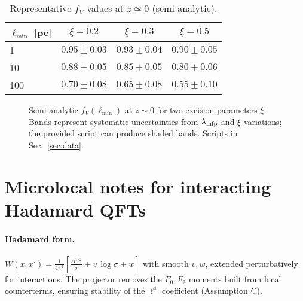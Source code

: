 \documentclass[aps,prd,onecolumn,superscriptaddress,nofootinbib]{revtex4-2}
\begin{document}
\begin{table}[b]
\centering
\caption{Representative \(f_V\) values at \(z\simeq 0\) (semi-analytic).}
\label{tab:fV}
\begin{tabular}{lccc}
\toprule
\(\ell_{\min}\) [pc] & \(\xi=0.2\) & \(\xi=0.3\) & \(\xi=0.5\) \\
\midrule
1   & \(0.95\pm0.03\) & \(0.93\pm0.04\) & \(0.90\pm0.05\) \\
10  & \(0.88\pm0.05\) & \(0.85\pm0.05\) & \(0.80\pm0.06\) \\
100 & \(0.70\pm0.08\) & \(0.65\pm0.08\) & \(0.55\pm0.10\) \\
\bottomrule
\end{tabular}
\end{table}

\begin{figure}[t]
\centering
{}
\caption{Semi-analytic \(f_V(\ell_{\min})\) at \(z\!\sim\!0\) for two excision parameters \(\xi\). Bands represent systematic uncertainties from \(\lambda_{\rm mfp}\) and \(\xi\) variations; the provided script can produce shaded bands. Scripts in Sec.~\ref{sec:data}.}
\label{fig:fV}
\end{figure}

\section{Microlocal notes for interacting Hadamard QFTs}
\label{app:microlocal}
\paragraph{Hadamard form.}
\(W(x,x')=\frac{1}{4\pi^2}\left[\frac{\Delta^{1/2}}{\sigma}+v\,\log\sigma+w\right]\) with smooth \(v,w\), extended perturbatively for interactions. The projector removes the \(F_0,F_2\) moments built from local counterterms, ensuring stability of the \(\ell^4\) coefficient (Assumption C).
\end{document}
